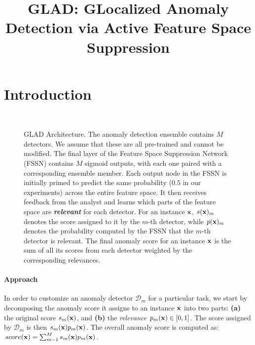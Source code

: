 \documentclass{article}
\title{GLAD: {\bf GL}ocalized {\bf A}nomaly {\bf D}etection via Active Feature Space Suppression}
\begin{document}
\maketitle

\section{Introduction}

\begin{figure}[t]
	\centering
	\captionsetup{labelformat=empty}
	 \\[-1ex]
	\caption{GLAD Architecture. The anomaly detection ensemble contains $M$ detectors. We assume that these are all pre-trained and cannot be modified. The final layer of the Feature Space Suppression Network (FSSN) contains $M$ sigmoid outputs, with each one paired with a corresponding ensemble member. Each output node in the FSSN is initially primed to predict the same probability ($0.5$ in our experiments) across the entire feature space. It then receives feedback from the analyst and learns which parts of the feature space are \textit{\textbf{relevant}} for each detector. For an instance ${\bf x}$, $s({\bf x})_m$ denotes the score assigned to it by the $m$-th detector, while $p({\bf x})_m$ denotes the probability computed by the FSSN that the $m$-th detector is relevant. The final anomaly score for an instance ${\bf x}$ is the sum of all its scores from each detector weighted by the corresponding relevances.}
	\label{fig:architecture}
\end{figure}

\paragraph{Approach} In order to customize an anomaly detector $\mathcal{D}_m$ for a particular task, we start by decomposing the anomaly score it assigns to an instance ${\bf x}$ into two parts: {\bf (a)} the original score $s_m({\bf x})$, and {\bf (b)} the \textit{relevance} $p_m({\bf x}) \in [0, 1]$. The score assigned by $\mathcal{D}_m$ is then $s_m({\bf x})p_m({\bf x})$. The overall anomaly score is computed as: $score({\bf x}) = \sum_{m=1}^M{s_m({\bf x})p_m({\bf x})}$.
\end{document}
